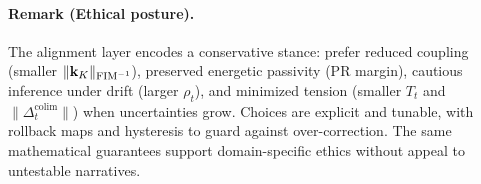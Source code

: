 \paragraph{Remark (Ethical posture).} The alignment layer encodes a conservative stance: prefer reduced coupling (smaller $\|\mathbf k_K\|_{\mathrm{FIM}^{-1}}$), preserved energetic passivity (PR margin), cautious inference under drift (larger $\rho_t$), and minimized tension (smaller $T_t$ and $\|\Delta^{\mathrm{colim}}_t\|$) when uncertainties grow. Choices are explicit and tunable, with rollback maps and hysteresis to guard against over-correction. The same mathematical guarantees support domain-specific ethics without appeal to untestable narratives.



\nocite{*}
\printbibliography
